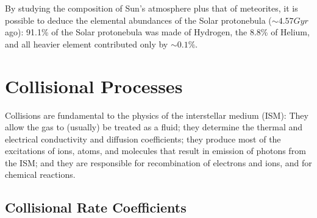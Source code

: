 \par By studying the composition of Sun's atmosphere plus that of meteorites, it is possible to deduce the elemental abundances of the Solar protonebula ($\sim 4.57 \unit{Gyr}$ ago): 91.1\% of the Solar protonebula was made of Hydrogen, the 8.8\% of Helium, and all heavier element contributed only by $\sim 0.1\%$.

\section{Collisional Processes}

Collisions are fundamental to the physics of the interstellar medium (ISM): They allow the gas to (usually) be treated as a fluid; they determine the thermal and electrical conductivity and diffusion coefficients; they produce most of the excitations of ions, atoms, and molecules that result in emission of photons from the ISM; and they are responsible for recombination of electrons and ions, and for chemical reactions.

\subsection{Collisional Rate Coefficients}

